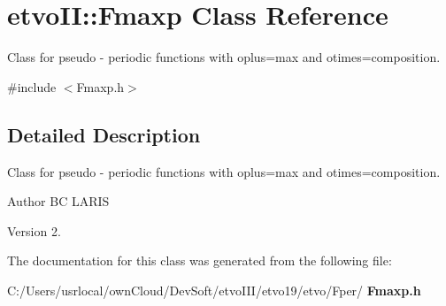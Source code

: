 \section{etvo\+II\+:\+:Fmaxp Class Reference}
\label{classetvo_i_i_1_1_fmaxp}


Class for pseudo -\/ periodic functions with oplus=max and otimes=composition.  




{\ttfamily \#include $<$Fmaxp.\+h$>$}



\subsection{Detailed Description}
Class for pseudo -\/ periodic functions with oplus=max and otimes=composition. 

\begin{DoxyAuthor}{Author}
BC L\+A\+R\+IS 
\end{DoxyAuthor}
\begin{DoxyVersion}{Version}
2. 
\end{DoxyVersion}


The documentation for this class was generated from the following file\+:\begin{DoxyCompactItemize}
\item 
C\+:/\+Users/usrlocal/own\+Cloud/\+Dev\+Soft/etvo\+I\+I\+I/etvo19/etvo/\+Fper/\textbf{ Fmaxp.\+h}\end{DoxyCompactItemize}
